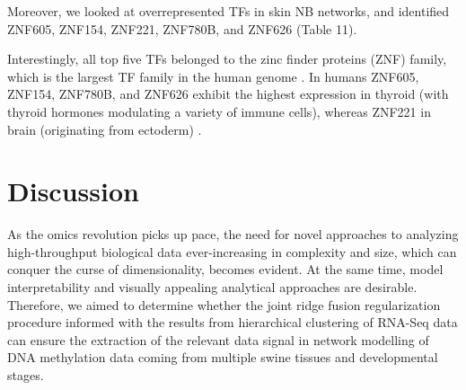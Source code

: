 \documentclass[
	a4paper, %
	10pt, %
	unnumberedsections, %
	twoside, %
]{LTJournalArticle}
\begin{document}
\noindent Moreover, we looked at overrepresented TFs in skin NB networks, 
and identified ZNF605, ZNF154, ZNF221, ZNF780B, and ZNF626 (Table 11).

\begin{table}[H]
	\caption{Transcription Factor Target Over-representation Analysis results for 10 genes with the highest betweenness centrality in the skin NB network from the ChEA3 web tool.}
	\label{tab:skinNB_tf}
	\end{table}

\noindent Interestingly, all top five TFs belonged to the zinc finder proteins (ZNF) family,
which is the largest TF family in the human genome \autocite{jen2016a}. In humans ZNF605, ZNF154, ZNF780B, and
ZNF626 exhibit the highest expression in thyroid (with thyroid hormones modulating a variety
of immune cells), whereas ZNF221 in brain 
(originating from ectoderm) \autocite{elshazzly2023a, sayers2022a, jara2017a}.


\section{\large Discussion}

As the omics revolution picks up pace, the need for novel approaches to analyzing 
high-throughput biological data ever-increasing in complexity and size, which can 
conquer the curse of dimensionality, becomes evident. 
At the same time, model interpretability and
visually appealing analytical approaches
are desirable. Therefore, we aimed to 
determine whether the joint ridge fusion regularization procedure 
informed with the results from hierarchical clustering 
of RNA-Seq data
can ensure the extraction of the relevant data signal 
in network modelling of DNA methylation data coming 
from multiple swine tissues and developmental stages.
\end{document}
